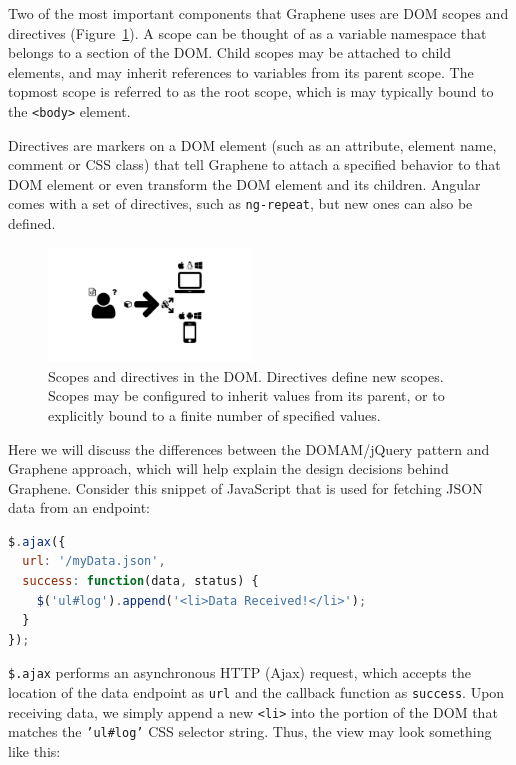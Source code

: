 Two of the most important components that Graphene uses are DOM scopes and directives (Figure~\ref{Figure:dom-scope}).
A scope can be thought of as a variable namespace that belongs to a section of the DOM.
Child scopes may be attached to child elements, and may inherit references to variables from its parent scope.
The topmost scope is referred to as the root scope, which is may typically bound to the \texttt{<body>} element.

Directives are markers on a DOM element (such as an attribute, element name, comment or CSS class) that tell Graphene to attach a specified behavior to that DOM element or even transform the DOM element and its children. \autocite{google2014angularDirectives, google2014angulardirectives2}
Angular comes with a set of directives, such as \texttt{ng-repeat}, but new ones can also be defined.

\begin{figure}
  \centering
  \includegraphics[width=0.48\textwidth, page=23, trim=0cm 0cm 11cm 0cm, clip=true]{images/Figures.pdf}
  \caption{Scopes and directives in the DOM. Directives define new scopes. Scopes may be configured to inherit values from its parent, or to explicitly bound to a finite number of specified values.}
  \label{Figure:dom-scope}
\end{figure}


Here we will discuss the differences between the DOMAM/jQuery pattern and Graphene approach, which will help explain the design decisions behind Graphene.
Consider this snippet of JavaScript that is used for fetching JSON data from an endpoint:

\begin{lstlisting}[language=JavaScript]
$.ajax({
  url: '/myData.json',
  success: function(data, status) {
    $('ul#log').append('<li>Data Received!</li>');
  }
});
\end{lstlisting}

\texttt{\$.ajax} performs an asynchronous HTTP (Ajax) request, which accepts the location of the data endpoint as \texttt{url} and the callback function as \texttt{success}.
Upon receiving data, we simply append a new \texttt{<li>} into the portion of the DOM that matches the \texttt{'ul\#log'} CSS selector string.
Thus, the view may look something like this:

